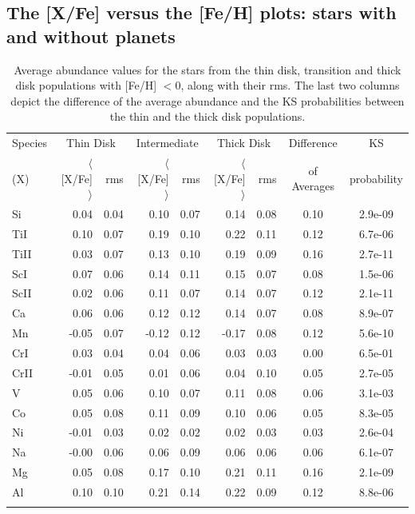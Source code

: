 \documentclass[oldversion]{aa}
\newcommand\T{\rule{0pt}{2.6ex}}
\newcommand\B{\rule[-1.2ex]{0pt}{0pt}}
\begin{document}




\subsection{The [X/Fe] versus the [Fe/H] plots: stars with and without planets}
\label{section:xfefeh}

\begin{table}[t!]
\centering
\caption[]{Average abundance values for the stars from the thin disk, transition and thick disk populations with [Fe/H] $< 0$, along with their rms. The last two columns depict the difference of the average abundance and the KS probabilities between the thin and the thick disk populations.}
\begin{tabular}{ l r r r r r r c c}

\hline
\hline
Species \T & \multicolumn {2}{c}{Thin Disk} & \multicolumn {2}{c}{Intermediate} & \multicolumn {2}{c}{Thick Disk} & Difference & KS \\
(X) \B & $\langle$[X/Fe]$\rangle$ & rms & $\langle$[X/Fe]$\rangle$ & rms & $\langle$[X/Fe]$\rangle$ & rms & of Averages & probability \\
\hline
Si & 0.04 & 0.04 & 0.10 & 0.07 & 0.14 & 0.08 & 0.10 & 2.9e-09 \\ 
TiI & 0.10 & 0.07 & 0.19 & 0.10 & 0.22 & 0.11 & 0.12 & 6.7e-06 \\ 
TiII & 0.03 & 0.07 & 0.13 & 0.10 & 0.19 & 0.09 & 0.16 & 2.7e-11 \\ 
ScI & 0.07 & 0.06 & 0.14 & 0.11 & 0.15 & 0.07 & 0.08 & 1.5e-06 \\ 
ScII & 0.02 & 0.06 & 0.11 & 0.07 & 0.14 & 0.07 & 0.12  & 2.1e-11 \\ 
Ca & 0.06 & 0.06 & 0.12 & 0.12 & 0.14 & 0.07 & 0.08 & 8.9e-07 \\ 
Mn & -0.05 & 0.07 & -0.12 & 0.12 & -0.17 & 0.08 & 0.12 & 5.6e-10 \\ 
CrI & 0.03 & 0.04 & 0.04 & 0.06 & 0.03 & 0.03 & 0.00  & 6.5e-01 \\ 
CrII & -0.01 & 0.05 & 0.01 & 0.06 & 0.04 & 0.10 & 0.05  & 2.7e-05 \\ 
V & 0.05 & 0.06 & 0.10 & 0.07 & 0.11 & 0.08 & 0.06  & 3.1e-03 \\ 
Co & 0.05 & 0.08 & 0.11 & 0.09 & 0.10 & 0.06 & 0.05 & 8.3e-05 \\ 
Ni & -0.01 & 0.03 & 0.02 & 0.02 & 0.02 & 0.03 &0.03 & 2.6e-04 \\ 
Na & -0.00 & 0.06 & 0.06 & 0.09 & 0.06 & 0.06 & 0.06 & 6.1e-07 \\ 
Mg & 0.05 & 0.08 & 0.17 & 0.10 & 0.21 & 0.11 & 0.16 & 2.1e-09 \\ 
Al & 0.10 & 0.10 & 0.21 & 0.14 & 0.22 & 0.09 & 0.12  & 8.8e-06 \\ 
\hline
\label {table:avgabundTD}
\end{tabular}
\end{table}
\end{document}
